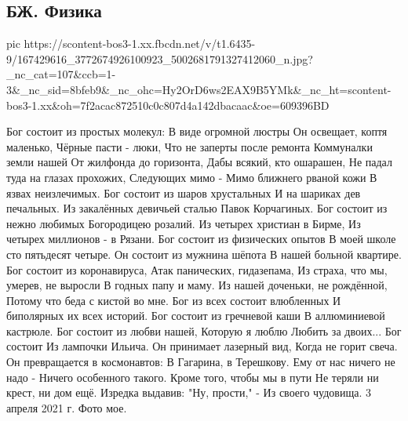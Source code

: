  
 
 
 
 

\subsection{БЖ. Физика}


\ifcmt
  pic https://scontent-bos3-1.xx.fbcdn.net/v/t1.6435-9/167429616_3772674926100923_5002681791327412060_n.jpg?_nc_cat=107&ccb=1-3&_nc_sid=8bfeb9&_nc_ohc=Hy2OrD6ws2EAX9B5YMk&_nc_ht=scontent-bos3-1.xx&oh=7f2acac872510c0c807d4a142dbacaac&oe=609396BD
\fi


Бог состоит из простых молекул:
В виде огромной люстры
Он освещает, коптя маленько,
Чёрные пасти - люки,
Что не заперты после ремонта
Коммуналки земли нашей
От жилфонда до горизонта,
Дабы всякий, кто ошарашен,
Не падал туда на глазах прохожих,
Следующих мимо -
Мимо ближнего рваной кожи
В язвах неизлечимых.
Бог состоит из шаров хрустальных
И на шариках дев печальных.
Из закалённых девичьей сталью
Павок Корчагиных.
Бог состоит из нежно любимых
Богородицею розалий.
Из четырех христиан в Бирме,
Из четырех миллионов - в Рязани.
Бог состоит из физических опытов
В моей школе сто пятьдесят четыре.
Он состоит из мужнина шёпота
В нашей больной квартире.
Бог состоит из коронавируса,
Атак панических, гидазепама,
Из страха, что мы, умерев, не выросли
В годных папу и маму.
Из нашей доченьки, не рождённой,
Потому что беда с кистой во мне.
Бог из всех состоит влюбленных 
И биполярных их всех историй.
Бог состоит из гречневой каши
В аллюминиевой кастрюле.
Бог состоит из любви нашей,
Которую я люблю
Любить за двоих... Бог состоит
Из лампочки Ильича.
Он принимает лазерный вид,
Когда не горит свеча.
Он превращается в космонавтов:
В Гагарина, в Терешкову.
Ему от нас ничего не надо  -
Ничего особенного такого.
Кроме того, чтобы мы в пути
Не теряли ни крест, ни дом ещё.
Изредка выдавив: "Ну, прости," -
Из своего чудовища.
3 апреля 2021 г.
Фото мое.

